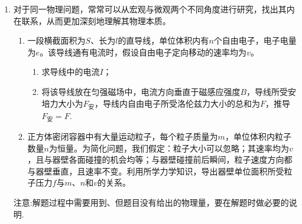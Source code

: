\begin{enumerate}



\newpage
\item
{}
对于同一物理问题，常常可以从宏观与微观两个不同角度进行研究，找出其内在联系，从而更加深刻地理解其物理本质。
\begin{enumerate}
\renewcommand{\labelenumi}{\arabic{enumi}.}
\item
一段横截面积为$ S $、长为$ l $的直导线，单位体积内有$ n $个自由电子，电子电量为$ e $。该导线通有电流时，假设自由电子定向移动的速率均为$ v $。
\begin{enumerate}
\item
求导线中的电流$ I $； 
\item 
将该导线放在匀强磁场中，电流方向垂直于磁感应强度$ B $，导线所受安培力大小为$ F_{\text{安}} $，导线内自由电子所受洛伦兹力大小的总和为$ F $，推导$ F _{\text{安}} =F $.



\end{enumerate}

\item 
正方体密闭容器中有大量运动粒子，每个粒子质量为$ m $，单位体积内粒子数量$ n $为恒量。为简化问题，我们假定：粒子大小可以忽略；其速率均为$ v $，且与器壁各面碰撞的机会均等；与器壁碰撞前后瞬间，粒子速度方向都与器壁垂直，且速率不变。利用所学力学知识，导出器壁单位面积所受粒子压力$ f $与$ m $、$ n $和$ v $的关系。

\end{enumerate}
注意:解题过程中需要用到、但题目没有给出的物理量，要在解题时做必要的说明.





\end{enumerate}
